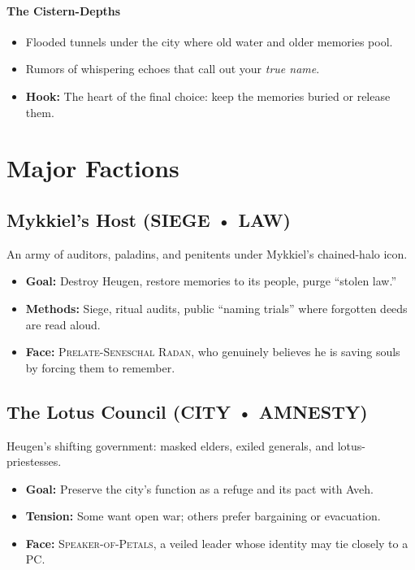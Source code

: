 \documentclass[11pt]{article}
\newcommand{\Tag}[1]{\textsc{#1}}
\newcommand{\NPC}[1]{\textsc{#1}}
\begin{document}
\paragraph{The Cistern-Depths}
\begin{itemize}[leftmargin=*]
  \item Flooded tunnels under the city where old water and older memories pool.
  \item Rumors of whispering echoes that call out your \emph{true name}.
  \item \textbf{Hook:} The heart of the final choice: keep the memories buried or release them.
\end{itemize}

\section{Major Factions}
\label{sec:factions}

\subsection*{Mykkiel's Host (\Tag{SIEGE} • \Tag{LAW})}

An army of auditors, paladins, and penitents under Mykkiel's chained-halo icon.

\begin{itemize}[leftmargin=*]
  \item \textbf{Goal:} Destroy Heugen, restore memories to its people, purge ``stolen law.''
  \item \textbf{Methods:} Siege, ritual audits, public ``naming trials'' where forgotten deeds are read aloud.
  \item \textbf{Face:} \NPC{Prelate-Seneschal Radan}, who genuinely believes he is saving souls by forcing them to remember.
\end{itemize}

\subsection*{The Lotus Council (\Tag{CITY} • \Tag{AMNESTY})}

Heugen's shifting government: masked elders, exiled generals, and lotus-priestesses.

\begin{itemize}[leftmargin=*]
  \item \textbf{Goal:} Preserve the city's function as a refuge and its pact with Aveh.
  \item \textbf{Tension:} Some want open war; others prefer bargaining or evacuation.
  \item \textbf{Face:} \NPC{Speaker-of-Petals}, a veiled leader whose identity may tie closely to a PC.
\end{itemize}
\end{document}
